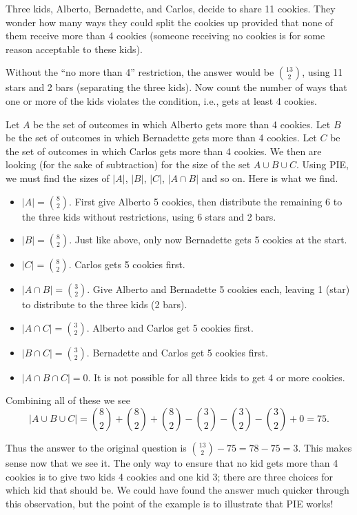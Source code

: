 \documentclass[12pt]{article}
\begin{document}
\begin{example}
Three kids, Alberto, Bernadette, and Carlos, decide to share 11 cookies.  They wonder how many ways they could split the cookies up provided that none of them receive more than 4 cookies (someone receiving no cookies is for some reason acceptable to these kids).

\begin{solution}
Without the ``no more than 4'' restriction, the answer would be ${13 \choose 2}$, using 11 stars and 2 bars (separating the three kids).  Now count the number of ways that one or more of the kids violates the condition, i.e., gets at least 4 cookies.

Let $A$ be the set of outcomes in which Alberto gets more than 4 cookies.  Let $B$ be the set of outcomes in which Bernadette gets more than 4 cookies.  Let $C$ be the set of outcomes in which Carlos gets more than 4 cookies.  We then are looking (for the sake of subtraction) for the size of the set $A \cup B \cup C$.  Using PIE, we must find the sizes of $|A|$, $|B|$, $|C|$, $|A\cap B|$ and so on.  Here is what we find.

\begin{itemize}
\item[] $|A| = {8 \choose 2}$.  First give Alberto 5 cookies, then distribute the remaining 6 to the three kids without restrictions, using 6 stars and 2 bars.
\item[] $|B| = {8 \choose 2}$.  Just like above, only now Bernadette gets 5 cookies at the start.
\item[] $|C| = {8 \choose 2}$.  Carlos gets 5 cookies first.

\item[] $|A \cap B| = {3 \choose 2}$.  Give Alberto and Bernadette 5 cookies each, leaving 1 (star) to distribute to the three kids (2 bars).

\item[] $|A \cap C| = {3 \choose 2}$.  Alberto and Carlos get 5 cookies first.

\item[] $|B \cap C| = {3 \choose 2}$.  Bernadette and Carlos get 5 cookies first.

\item[] $|A \cap B \cap C| = 0$.  It is not possible for all three kids to get 4 or more cookies.
\end{itemize}

Combining all of these we see
\[|A \cup B \cup C| = {8 \choose 2} + {8 \choose 2} + {8 \choose 2} - {3 \choose 2} - {3 \choose 2} - {3 \choose 2} + 0 = 75.\]

Thus the answer to the original question is ${13 \choose 2} - 75 = 78 - 75 = 3$.  This makes sense now that we see it.  The only way to ensure that no kid gets more than 4 cookies is to give two kids 4 cookies and one kid 3; there are three choices for which kid that should be.  We could have found the answer much quicker through this observation, but the point of the example is to illustrate that PIE works!
\end{solution}
\end{example}
\end{document}
